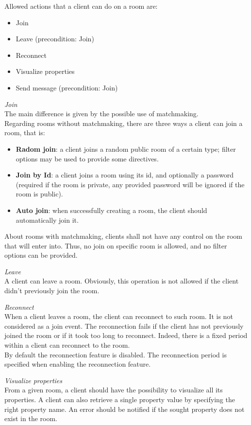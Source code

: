 \bigskip
Allowed actions that a client can do on a room are:
\begin{itemize}
\item Join
\item Leave (precondition: Join)
\item Reconnect
\item Visualize properties
\item Send message (precondition: Join)
\end{itemize}

\bigskip
\textit{Join}
\\
The main difference is given by the possible use of matchmaking.
\\
Regarding rooms without matchmaking, there are three ways a client can join a room, that is:
\begin{itemize}
\item \textbf{Radom join}: a client joins a random public room of a certain type; filter options may be used to provide some directives.
\item \textbf{Join by Id}: a client joins a room using its id, and optionally a password (required if the room is private, any provided password will be ignored if the room is public).
\item \textbf{Auto join}: when successfully creating a room, the client should automatically join it.
\end{itemize} 

About rooms with matchmaking, clients shall not have any control on the room that will enter into. Thus, no join on specific room is allowed, and no filter options can be provided. 

\bigskip
\textit{Leave}
\\
A client can leave a room. Obviously, this operation is not allowed if the client didn't previously join the room. 

\bigskip
\textit{Reconnect}
\\
When a client leaves a room, the client can reconnect to such room. It is not considered as a join event.
The reconnection fails if the client has not previously joined the room or if it took too long to reconnect. Indeed, there is a fixed period within a client can reconnect to the room.
\\
By default the reconnection feature is disabled. The reconnection period is specified when enabling the reconnection feature.

\bigskip
\textit{Visualize properties}
\\
From a given room, a client should have the possibility to visualize all its properties. A client can also retrieve a single property value by specifying the right property name. An error should be notified if the sought property does not exist in the room.

